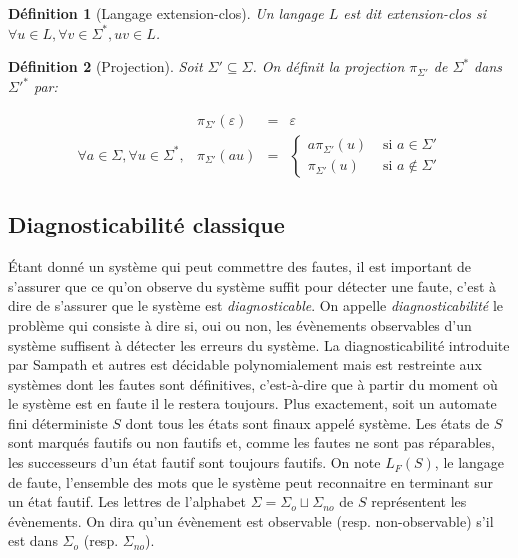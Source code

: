 \documentclass[conference]{IEEEtran}
\newtheorem{mydef}{D\'efinition}
\begin{document}
\begin{mydef}[Langage extension-clos]
Un langage $L$ est dit extension-clos si $\forall u \in L, \forall v \in \Sigma^*, uv \in L$.
\end{mydef}

\begin{mydef}[Projection]
Soit $\Sigma'\subseteq \Sigma$. On d\'efinit la projection $\pi_{\Sigma'}$ de $\Sigma^*$ dans $\Sigma'^*$ par:

$$\begin{array}{llll}
&\pi_{\Sigma'}(\varepsilon) &= &\varepsilon\\
\forall a \in \Sigma, \forall u \in \Sigma^*, &\pi_{\Sigma'}(au) &= &\left\{\begin{array}{ll}
a\pi_{\Sigma'}(u) &\text{ si } a \in \Sigma'\\
\pi_{\Sigma'}(u) &\text{ si } a \not\in \Sigma'
\end{array}\right.
\end{array}$$
\end{mydef}

\subsection{Diagnosticabilité classique}
\'Etant donné un système qui peut commettre des fautes, il est important de s'assurer que ce qu'on observe du système suffit pour détecter une faute, c'est à dire de s'assurer que le système est \emph{diagnosticable}. On appelle \emph{diagnosticabilité} le problème qui consiste à dire si, oui ou non, les évènements observables d'un système suffisent à détecter les erreurs du système. La diagnosticabilité introduite par Sampath et autres\cite{SamSRST96} est décidable polynomialement mais est restreinte aux systèmes dont les fautes sont définitives, c'est-à-dire que à partir du moment où le système est en faute il le restera toujours.
\newline
Plus exactement, soit un automate fini d\'eterministe $S$ dont tous les états sont finaux appel\'e syst\`eme. Les états de $S$ sont marqués fautifs ou non fautifs et, comme les fautes ne sont pas réparables, les successeurs d'un état fautif sont toujours fautifs. On note  $L_F(S)$, le langage de faute, l'ensemble des mots que le système peut reconnaitre en terminant sur un état fautif. Les lettres de l'alphabet $\Sigma=\Sigma_o\sqcup \Sigma_{no}$ de $S$ représentent les évènements. On dira qu'un \'ev\`enement est observable (resp. non-observable) s'il est dans $\Sigma_o$ (resp. $\Sigma_{no}$).
\end{document}
